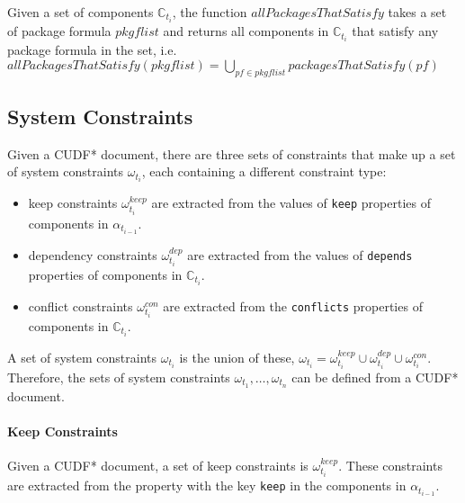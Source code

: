 \begin{defs}
Given a set of components $\mathbb{C}_{t_i}$,
the function $allPackagesThatSatisfy$ takes a set of package formula $pkgflist$ and returns all components in $\mathbb{C}_{t_i}$ that satisfy any package formula in the set,
i.e. $allPackagesThatSatisfy(pkgflist) = \bigcup \limits_{pf \in pkgflist} packagesThatSatisfy(pf)$ 
\end{defs}

\subsection{System Constraints}
Given a CUDF* document, there are three sets of constraints that make up a set of system constraints $\omega_{t_i}$, each containing a different constraint type:
\begin{itemize}
  \item keep constraints $\omega_{t_i}^{keep}$ are extracted from the values of \verb+keep+ properties of components in $\alpha_{t_{i-1}}$.
  \item dependency constraints $\omega_{t_i}^{dep}$ are extracted from the values of \verb+depends+ properties of components in $\mathbb{C}_{t_i}$.
  \item conflict constraints $\omega_{t_i}^{con}$ are extracted from the \verb+conflicts+ properties of components in $\mathbb{C}_{t_i}$.
\end{itemize}
A set of system constraints $\omega_{t_i}$ is the union of these,
$\omega_{t_i} =  \omega_{t_i}^{keep} \cup \omega_{t_i}^{dep} \cup \omega_{t_i}^{con}$.
Therefore, the sets of system constraints $\omega_{t_1},\ldots,\omega_{t_n}$ can be defined from a CUDF* document.

\paragraph{Keep Constraints}
Given a CUDF* document, a set of keep constraints is $\omega_{t_i}^{keep}$.
These constraints are extracted from the property with the key \texttt{keep} in the components in $\alpha_{t_{i-1}}$.


